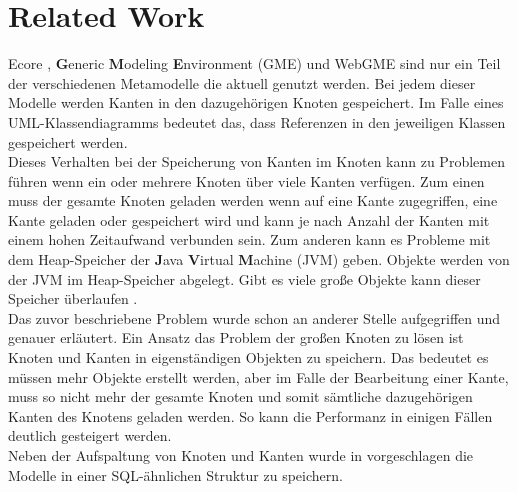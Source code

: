 \section{Related Work}
Ecore \cite{steinberg2008emf}, \textbf{G}eneric \textbf{M}odeling \textbf{E}nvironment (GME) \cite{ledeczi2001generic} und WebGME \cite{maroti2014online} sind nur ein Teil der verschiedenen Metamodelle die aktuell genutzt werden. Bei jedem dieser Modelle werden Kanten in den dazugehörigen Knoten gespeichert. Im Falle eines UML-Klassendiagramms bedeutet das, dass Referenzen in den jeweiligen Klassen gespeichert werden.\\
Dieses Verhalten bei der Speicherung von Kanten im Knoten kann zu Problemen führen wenn ein oder mehrere Knoten über viele Kanten verfügen. Zum einen muss der gesamte Knoten geladen werden wenn auf eine Kante zugegriffen, eine Kante geladen oder gespeichert wird und kann je nach Anzahl der Kanten mit einem hohen Zeitaufwand verbunden sein. Zum anderen kann es Probleme mit dem Heap-Speicher der \textbf{J}ava \textbf{V}irtual \textbf{M}achine (JVM) geben. Objekte werden von der JVM im Heap-Speicher abgelegt. Gibt es viele große Objekte kann dieser Speicher überlaufen \cite{Chen2005EFF}.\\
Das zuvor beschriebene Problem wurde schon an anderer Stelle \cite{scheidgen2013reference} aufgegriffen und genauer erläutert. Ein Ansatz das Problem der großen Knoten zu lösen ist Knoten und Kanten in eigenständigen Objekten zu speichern. Das bedeutet es müssen mehr Objekte erstellt werden, aber im Falle der Bearbeitung einer Kante, muss so nicht mehr der gesamte Knoten und somit sämtliche dazugehörigen Kanten des Knotens geladen werden. So kann die Performanz in einigen Fällen deutlich gesteigert werden.\\
Neben der Aufspaltung von Knoten und Kanten wurde in \cite{scheidgen2013reference} vorgeschlagen die Modelle in einer SQL-ähnlichen Struktur zu speichern.\\ 
